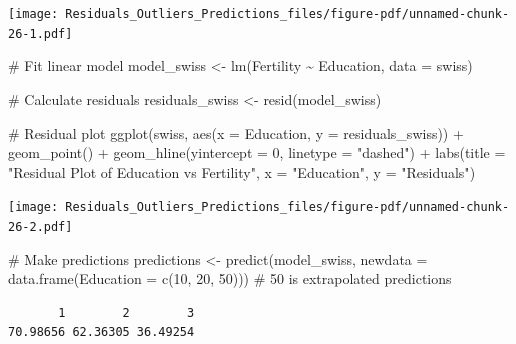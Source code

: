\documentclass[
  letterpaper,
  DIV=11,
  numbers=noendperiod]{scrreprt}
\newenvironment{Shaded}{\begin{snugshade}}{\end{snugshade}}
\newcommand{\AttributeTok}[1]{\textcolor[rgb]{0.40,0.45,0.13}{#1}}
\newcommand{\CommentTok}[1]{\textcolor[rgb]{0.37,0.37,0.37}{#1}}
\newcommand{\DecValTok}[1]{\textcolor[rgb]{0.68,0.00,0.00}{#1}}
\newcommand{\FunctionTok}[1]{\textcolor[rgb]{0.28,0.35,0.67}{#1}}
\newcommand{\NormalTok}[1]{\textcolor[rgb]{0.00,0.23,0.31}{#1}}
\newcommand{\OtherTok}[1]{\textcolor[rgb]{0.00,0.23,0.31}{#1}}
\newcommand{\SpecialCharTok}[1]{\textcolor[rgb]{0.37,0.37,0.37}{#1}}
\newcommand{\StringTok}[1]{\textcolor[rgb]{0.13,0.47,0.30}{#1}}
\begin{document}
\texttt{[image: Residuals\_Outliers\_Predictions\_files/figure-pdf/unnamed-chunk-26-1.pdf]}

\begin{Shaded}
\begin{Highlighting}[]
\CommentTok{\# Fit linear model}
\NormalTok{model\_swiss }\OtherTok{\textless{}{-}} \FunctionTok{lm}\NormalTok{(Fertility }\SpecialCharTok{\textasciitilde{}}\NormalTok{ Education, }\AttributeTok{data =}\NormalTok{ swiss)}

\CommentTok{\# Calculate residuals}
\NormalTok{residuals\_swiss }\OtherTok{\textless{}{-}} \FunctionTok{resid}\NormalTok{(model\_swiss)}

\CommentTok{\# Residual plot}
\FunctionTok{ggplot}\NormalTok{(swiss, }\FunctionTok{aes}\NormalTok{(}\AttributeTok{x =}\NormalTok{ Education, }\AttributeTok{y =}\NormalTok{ residuals\_swiss)) }\SpecialCharTok{+}
  \FunctionTok{geom\_point}\NormalTok{() }\SpecialCharTok{+}
  \FunctionTok{geom\_hline}\NormalTok{(}\AttributeTok{yintercept =} \DecValTok{0}\NormalTok{, }\AttributeTok{linetype =} \StringTok{"dashed"}\NormalTok{) }\SpecialCharTok{+}
  \FunctionTok{labs}\NormalTok{(}\AttributeTok{title =} \StringTok{"Residual Plot of Education vs Fertility"}\NormalTok{, }\AttributeTok{x =} \StringTok{"Education"}\NormalTok{, }\AttributeTok{y =} \StringTok{"Residuals"}\NormalTok{)}
\end{Highlighting}
\end{Shaded}

\texttt{[image: Residuals\_Outliers\_Predictions\_files/figure-pdf/unnamed-chunk-26-2.pdf]}

\begin{Shaded}
\begin{Highlighting}[]
\CommentTok{\# Make predictions}
\NormalTok{predictions }\OtherTok{\textless{}{-}} \FunctionTok{predict}\NormalTok{(model\_swiss, }\AttributeTok{newdata =} \FunctionTok{data.frame}\NormalTok{(}\AttributeTok{Education =} \FunctionTok{c}\NormalTok{(}\DecValTok{10}\NormalTok{, }\DecValTok{20}\NormalTok{, }\DecValTok{50}\NormalTok{))) }\CommentTok{\# 50 is extrapolated}
\NormalTok{predictions}
\end{Highlighting}
\end{Shaded}

\begin{verbatim}
       1        2        3 
70.98656 62.36305 36.49254 
\end{verbatim}

\end{document}
